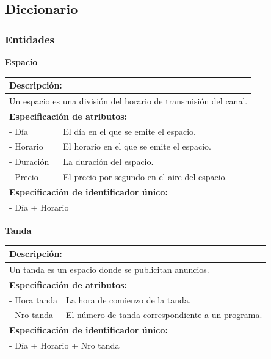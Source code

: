 \documentclass[a4paper,10pt]{article}
\begin{document}
  \subsection{Diccionario}
    \subsubsection{Entidades}
    \begin{flushleft}
      \begin{large} \bf{Espacio} \end{large}
    \end{flushleft}
      \begin{tabular}{| p{2cm} | p{9cm} |}
	\hline
	\multicolumn{2}{|l|}{\bf{Descripci\'on:}} \\
	\hline
	\multicolumn{2}{|l|}{Un espacio es una divisi\'on del horario de transmisi\'on del canal.} \\
	\hline	
	\multicolumn{2}{|l|}{\bf{Especificaci\'on de atributos:}} \\
	\hline
	- D\'ia & El d\'ia en el que se emite el espacio. \\
	\hline \hline
	- Horario & El horario en el que se emite el espacio. \\
	\hline \hline
	- Duraci\'on & La duraci\'on del espacio.\\
	\hline \hline
	- Precio & El precio por segundo en el aire del espacio.\\
	\hline
	\multicolumn{2}{|l|}{\bf{Especificaci\'on de identificador \'unico:}} \\
	\hline
	\multicolumn{2}{|l|}{- D\'ia + Horario} \\
	\hline
      \end{tabular}
    
    \begin{flushleft}
      \begin{large} \bf{Tanda} \end{large}
    \end{flushleft}
      \begin{tabular}{| p{2cm} | p{9cm} |}
	\hline
	\multicolumn{2}{|l|}{\bf{Descripci\'on:}} \\
	\hline
	\multicolumn{2}{|l|}{Un tanda es un espacio donde se publicitan anuncios.} \\
	\hline	
	\multicolumn{2}{|l|}{\bf{Especificaci\'on de atributos:}} \\
	\hline
	- Hora tanda & La hora de comienzo de la tanda. \\
	\hline \hline
	- Nro tanda & El n\'umero de tanda correspondiente a un programa. \\
	\hline
	\multicolumn{2}{|l|}{\bf{Especificaci\'on de identificador \'unico:}} \\
	\hline
	\multicolumn{2}{|l|}{- D\'ia + Horario + Nro tanda} \\
	\hline
      \end{tabular}
\end{document}
